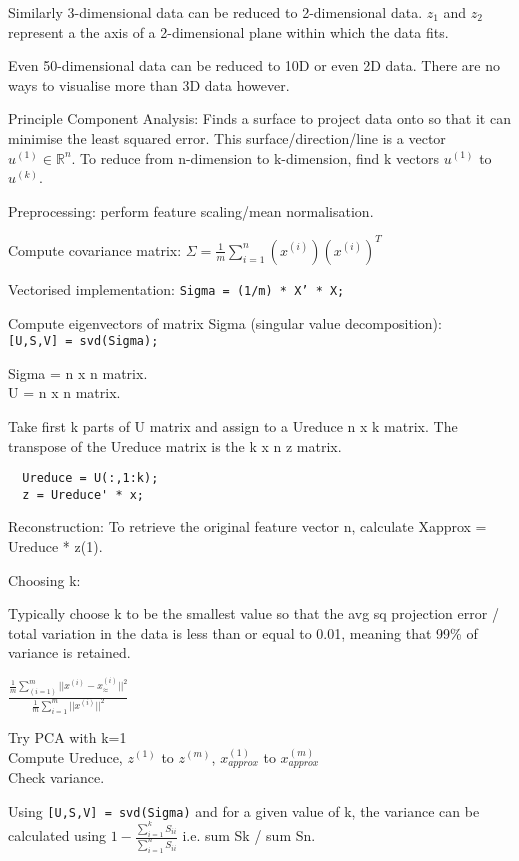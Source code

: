 \documentclass[12pt, a4paper]{article}
\begin{document}
{  Similarly 3-dimensional data can be reduced to 2-dimensional data. $z_1$ and
  $z_2$ represent a the axis of a 2-dimensional plane within which the data fits.  

  Even 50-dimensional data can be reduced to 10D or even 2D data. There are no 
  ways to visualise more than 3D data however. 
  
  Principle Component Analysis: Finds a surface to project data onto so that it
  can minimise the least squared error. This surface/direction/line is a vector
  $u^{(1)}\in\mathbb{R}^n$. To reduce from n-dimension to k-dimension, find k 
  vectors $u^{(1)}$ to $u^{(k)}$. 

  Preprocessing: perform feature scaling/mean normalisation.

  Compute covariance matrix: $\Sigma = \frac{1}{m} \displaystyle\sum_{i=1}^n 
  (x^{(i)})(x^{(i)})^T$

  Vectorised implementation: \texttt{Sigma = (1/m) * X' * X;}

  Compute eigenvectors of matrix Sigma (singular value decomposition):\\ 
  \texttt{[U,S,V] = svd(Sigma);}

  Sigma = n x n matrix.\\
  U = n x n matrix.

  Take first k parts of U matrix and assign to a Ureduce n x k matrix. The 
  transpose of the Ureduce matrix is the k x n z matrix. 

  \begin{lstlisting}
  Ureduce = U(:,1:k); 
  z = Ureduce' * x;
  \end{lstlisting}

  Reconstruction: To retrieve the original feature vector n, calculate
  Xapprox = Ureduce * z(1).

  Choosing k:

  Typically choose k to be the smallest value so that the avg sq projection
  error / total variation in the data is less than or equal to 0.01, meaning
  that 99\% of variance is retained. 

  $\frac{\frac{1}{m} \sum_{(i=1)}^m ||x^{(i)} - x_{\approx}^{(i)}||^2} 
  {\frac{1}{m} \sum_{i=1}^m ||x^{(i)}||^2}$

  Try PCA with k=1\\Compute Ureduce, $z^{(1)}$ to $z^{(m)}$, $x_{approx}^{(1)}$ 
  to $x_{approx}^{(m)}$\\Check variance. 

  Using \texttt{[U,S,V] = svd(Sigma)} and for a given value of k, the variance
  can be calculated using $1-\frac{\sum_{i=1}^k S_{ii}}{\sum_{i=1}^n S_{ii}}$ 
  i.e. sum Sk / sum Sn.

}
\end{document}
